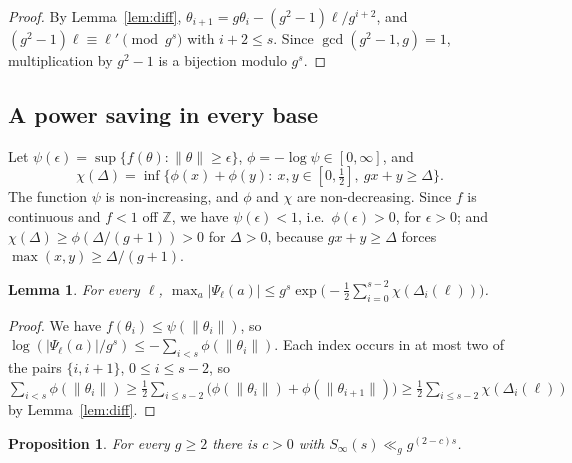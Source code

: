 \documentclass[11pt]{amsart}
\newtheorem{proposition}[theorem]{Proposition}
\newtheorem{lemma}[theorem]{Lemma}
\theoremstyle{definition}
\numberwithin{equation}{section}
\newcommand{\Z}{\mathbb{Z}}
\newcommand{\Sinf}{S_\infty}
\begin{document}
\begin{proof}
By Lemma~\ref{lem:diff}, $\theta_{i+1}=g\theta_i-(g^2-1)\ell/g^{i+2}$, and
$(g^2-1)\ell\equiv\ell'\pmod{g^s}$ with $i+2\le s$. Since
$\gcd(g^2-1,g)=1$, multiplication by $g^2-1$ is a bijection modulo $g^s$.
\end{proof}

\subsection{A power saving in every base}\label{subsec:pairing}
Let $\psi(\epsilon)=\sup\{f(\theta):\|\theta\|\ge\epsilon\}$,
$\phi=-\log\psi\in[0,\infty]$, and
\[
\chi(\Delta)=\inf\{\phi(x)+\phi(y):\ x,y\in[0,\tfrac12],\ gx+y\ge\Delta\}.
\]
The function $\psi$ is non-increasing, and $\phi$ and $\chi$ are
non-decreasing. Since $f$ is continuous and $f<1$ off
$\Z$, we have $\psi(\epsilon)<1$, i.e.\ $\phi(\epsilon)>0$, for
$\epsilon>0$; and $\chi(\Delta)\ge\phi(\Delta/(g+1))>0$ for $\Delta>0$,
because $gx+y\ge\Delta$ forces $\max(x,y)\ge\Delta/(g+1)$.

\begin{lemma}\label{lem:chain}
For every $\ell$,
$\max_a|\Psi_\ell(a)|\le g^s\exp\bigl(-\frac12\sum_{i=0}^{s-2}\chi(\Delta_i(\ell))\bigr)$.
\end{lemma}

\begin{proof}
We have $f(\theta_i)\le\psi(\|\theta_i\|)$, so
$\log(|\Psi_\ell(a)|/g^s)\le-\sum_{i<s}\phi(\|\theta_i\|)$. Each index occurs
in at most two of the pairs $\{i,i+1\}$, $0\le i\le s-2$, so
$\sum_{i<s}\phi(\|\theta_i\|)\ge\frac12\sum_{i\le s-2}\bigl(\phi(\|\theta_i\|)+\phi(\|\theta_{i+1}\|)\bigr)\ge\frac12\sum_{i\le s-2}\chi(\Delta_i(\ell))$
by Lemma~\ref{lem:diff}.
\end{proof}

\begin{proposition}\label{prop:pairing}
For every $g\ge2$ there is $c>0$ with $\Sinf(s)\ll_gg^{(2-c)s}$.
\end{proposition}
\end{document}
